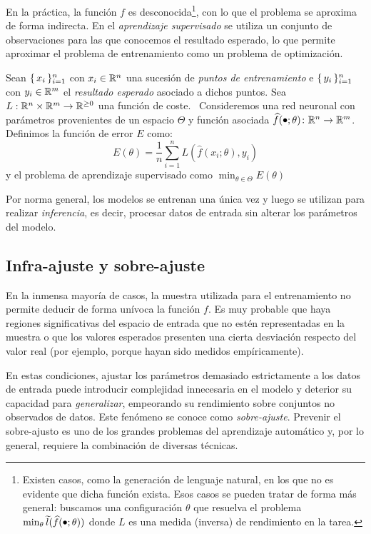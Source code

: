 En la práctica, la función \( f \) es desconocida\footnote{Existen casos, como la generación de lenguaje natural, en los que no es evidente que dicha función exista. Esos casos se pueden tratar de forma más general: buscamos una configuración \( \theta \) que resuelva el problema \( \min_\theta \widetilde{l}(\widehat{f}(\smallbullet; \theta))\) donde \( L \) es una medida (inversa) de rendimiento en la tarea.}, con lo que el problema se aproxima de forma indirecta. En el \textit{aprendizaje supervisado} se utiliza un conjunto de observaciones para las que conocemos el resultado esperado, lo que permite aproximar el problema de entrenamiento como un problema de optimización.

\begin{definition}
    Sean \( \{\,x_{i}\,\}_{i = 1}^n \) con \( x_{i} \in \mathbb{R}^{n} \) una sucesión de \textit{puntos de entrenamiento} e \( \{\, y_{i} \,\}_{i = 1}^n \) con \( y_{i} \in \mathbb{R}^{m} \) el \textit{resultado esperado} asociado a dichos puntos. Sea \( L: \mathbb{R}^{n} \times \mathbb{R}^{m} \to \mathbb{R}^{\geq 0} \) una función de coste.
    \
    Consideremos una red neuronal con parámetros provenientes de un espacio \( \Theta \) y función asociada \( \widehat{f}(\smallbullet; \theta) \colon \real{n} \to \real{m} \). Definimos la función de error \( E \) como:
    \[
        E(\theta) = \frac{1}{n} \sum_{i = 1}^n L\left( \widehat{f}(x_{i}; \theta), y_{i} \right)
    \]
    y el problema de aprendizaje supervisado como \( \min_{\theta \in \Theta} E(\theta) \)
\end{definition}

Por norma general, los modelos se entrenan una única vez y luego se utilizan para realizar \textit{inferencia}, es decir, procesar datos de entrada sin alterar los parámetros del modelo. 

\subsection{Infra-ajuste y sobre-ajuste}
En la inmensa mayoría de casos, la muestra utilizada para el entrenamiento no permite deducir de forma unívoca la función \( f \). Es muy probable que haya regiones significativas del espacio de entrada que no estén representadas en la muestra o que los valores esperados presenten una cierta desviación respecto del valor real (por ejemplo, porque hayan sido medidos empíricamente).

En estas condiciones, ajustar los parámetros demasiado estrictamente a los datos de entrada puede introducir complejidad innecesaria en el modelo y deterior su capacidad para \textit{generalizar}, empeorando su rendimiento sobre conjuntos no observados de datos. Este fenómeno se conoce como \textit{sobre-ajuste}. Prevenir el sobre-ajusto es uno de los grandes problemas del aprendizaje automático y, por lo general, requiere la combinación de diversas técnicas.

